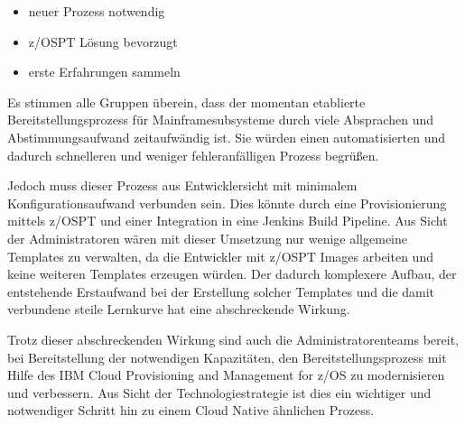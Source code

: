 \begin{itemize}
\item neuer Prozess notwendig
\item z/OSPT Lösung bevorzugt
\item erste Erfahrungen sammeln
\end{itemize}

Es stimmen alle Gruppen überein, dass der momentan etablierte Bereitstellungsprozess für Mainframesubsysteme durch viele Absprachen und Abstimmungsaufwand zeitaufwändig ist.
Sie würden einen automatisierten und dadurch schnelleren und weniger fehleranfälligen Prozess begrüßen.

Jedoch muss dieser Prozess aus Entwicklersicht mit minimalem Konfigurationsaufwand verbunden sein.
Dies könnte durch eine Provisionierung mittels z/OSPT und einer Integration in eine Jenkins Build Pipeline.
Aus Sicht der Administratoren wären mit dieser Umsetzung nur wenige allgemeine Templates zu verwalten, da die Entwickler mit z/OSPT Images arbeiten und keine weiteren Templates erzeugen würden.
Der dadurch komplexere Aufbau, der entstehende Erstaufwand bei der Erstellung solcher Templates  und die damit verbundene steile Lernkurve hat eine abschreckende Wirkung.

Trotz dieser abschreckenden Wirkung sind auch die Administratorenteams bereit, bei Bereitstellung der notwendigen Kapazitäten, den Bereitstellungsprozess mit Hilfe des \glqq IBM Cloud Provisioning and Management for z/OS\grqq{} zu modernisieren und verbessern.
Aus Sicht der Technologiestrategie ist dies ein wichtiger und notwendiger Schritt hin zu einem Cloud Native ähnlichen Prozess.
